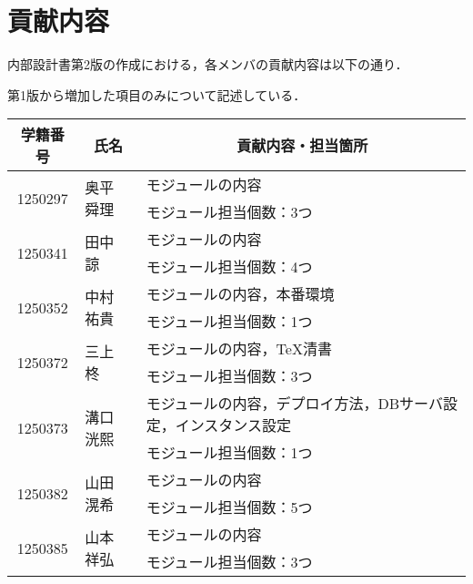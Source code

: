\chapter{貢献内容}
内部設計書第2版の作成における，各メンバの貢献内容は以下の通り．\par
第1版から増加した項目のみについて記述している．
\begin{table}[h]
	\centering
	\begin{tabularx}{\textwidth}{cll}
		\multicolumn{1}{c}{学籍番号} & \multicolumn{1}{c}{氏名} & \multicolumn{1}{c}{貢献内容・担当箇所}\\
		\hline
		\multirow{2}{*}{1250297} & \multirow{2}{*}{奥平 舜理} & モジュールの内容\\
		                         &                        & モジュール担当個数：3つ\\
		\hline
		\multirow{2}{*}{1250341} & \multirow{2}{*}{田中 諒}  & モジュールの内容\\
		                         &                        & モジュール担当個数：4つ\\
		\hline
		\multirow{2}{*}{1250352} & \multirow{2}{*}{中村 祐貴} & モジュールの内容，本番環境\\
		                         &                        & モジュール担当個数：1つ\\
		\hline
		\multirow{2}{*}{1250372} & \multirow{2}{*}{三上 柊}  & モジュールの内容，\TeX 清書\\
		                         &                        & モジュール担当個数：3つ\\
		\hline
		\multirow{2}{*}{1250373} & \multirow{2}{*}{溝口 洸熙} & モジュールの内容，デプロイ方法，DBサーバ設定，インスタンス設定\\
		                         &                        & モジュール担当個数：1つ\\
		\hline
		\multirow{2}{*}{1250382} & \multirow{2}{*}{山田 滉希} & モジュールの内容\\
		                         &                        & モジュール担当個数：5つ\\
		\hline
		\multirow{2}{*}{1250385} & \multirow{2}{*}{山本 祥弘} & モジュールの内容\\
		                         &                        & モジュール担当個数：3つ\\
		\hline
	\end{tabularx}
\end{table}
